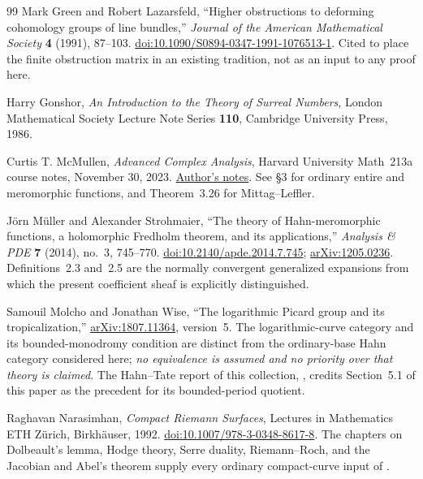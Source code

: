 \documentclass[11pt,letterpaper]{article}
\theoremstyle{definition}
\theoremstyle{remark}
\numberwithin{equation}{section}
\begin{document}
\begin{thebibliography}{99}
Mark Green and Robert Lazarsfeld,
``Higher obstructions to deforming cohomology groups of line bundles,''
\emph{Journal of the American Mathematical Society} \textbf{4} (1991), 87--103.
\href{https://doi.org/10.1090/S0894-0347-1991-1076513-1}{doi:10.1090/S0894-0347-1991-1076513-1}.
Cited to place the finite obstruction matrix in an existing tradition, not as an input to any proof here.

Harry Gonshor, \emph{An Introduction to the Theory of Surreal Numbers},
London Mathematical Society Lecture Note Series \textbf{110}, Cambridge University Press, 1986.

Curtis T. McMullen, \emph{Advanced Complex Analysis}, Harvard University Math~213a course notes, November 30, 2023.
\href{https://people.math.harvard.edu/~ctm/home/text/class/harvard/213a/23/html/home/course/course.pdf}{Author's notes}.
See \S3 for ordinary entire and meromorphic functions, and Theorem~3.26 for Mittag--Leffler.

J\"orn M\"uller and Alexander Strohmaier,
``The theory of Hahn-meromorphic functions, a holomorphic Fredholm theorem, and its applications,''
\emph{Analysis \& PDE} \textbf{7} (2014), no.~3, 745--770.
\href{https://doi.org/10.2140/apde.2014.7.745}{doi:10.2140/apde.2014.7.745};
\href{https://arxiv.org/abs/1205.0236}{arXiv:1205.0236}.
Definitions~2.3 and~2.5 are the normally convergent generalized expansions from which the present coefficient sheaf is explicitly distinguished.

Samouil Molcho and Jonathan Wise,
``The logarithmic Picard group and its tropicalization,''
\href{https://arxiv.org/abs/1807.11364}{arXiv:1807.11364}, version~5.
The logarithmic-curve category and its bounded-monodromy condition are distinct from the ordinary-base Hahn category considered here; \emph{no equivalence is assumed and no priority over that theory is claimed}.
The Hahn--Tate report of this collection, , credits Section~5.1 of this paper as the precedent for its bounded-period quotient.

Raghavan Narasimhan, \emph{Compact Riemann Surfaces},
Lectures in Mathematics ETH Z\"urich, Birkh\"auser, 1992.
\href{https://doi.org/10.1007/978-3-0348-8617-8}{doi:10.1007/978-3-0348-8617-8}.
The chapters on Dolbeault's lemma, Hodge theory, Serre duality, Riemann--Roch, and the Jacobian and Abel's theorem supply every ordinary compact-curve input of .


\end{thebibliography}
\end{document}
